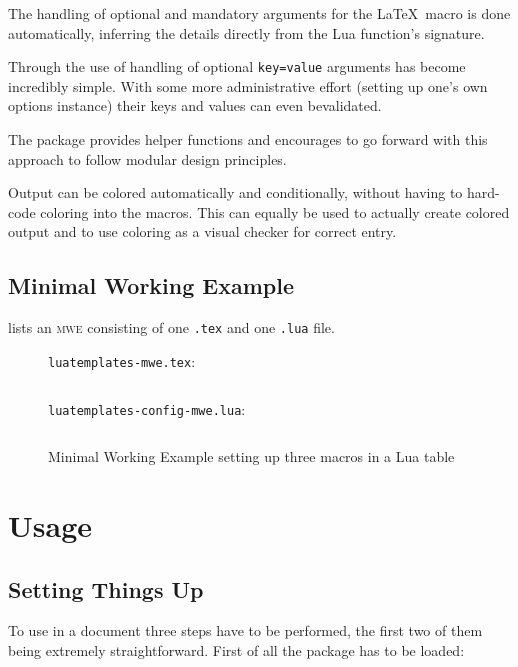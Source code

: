 \documentclass{scrartcl}
\begin{document}
\begin{itemize*}
\item The handling of optional and mandatory arguments for the \LaTeX\ macro is
done automatically, inferring the details directly from the Lua function's signature.
\item Through the use of  handling of optional
\texttt{key=value} arguments has become incredibly simple.  With some more
administrative effort (setting up one's own options instance) their keys and
values can even bevalidated.
\item The package provides helper functions and encourages to go forward with
this approach to follow modular design principles.
\item Output can be colored automatically and conditionally, without having to
hard-code coloring into the macros. This can equally be used to actually create
colored output and to use coloring as a visual checker for correct entry.
\end{itemize*}


\subsection{Minimal Working Example}
\label{sec:mwe}

 lists an \textsc{mwe} consisting of one \texttt{.tex} and one
\texttt{.lua} file.

\begin{figure}
\texttt{luatemplates-mwe.tex}:

\inputminted[frame=lines]{tex}{luatemplates-mwe.tex}

\noindent
\texttt{luatemplates-config-mwe.lua}:

\inputminted[frame=lines]{lua}{luatemplates-config-mwe.lua}

\caption{Minimal Working Example setting up three macros in a Lua table}
\label{fig:mwe}
\end{figure}


\section{Usage}
\label{sec:usage}

\subsection{Setting Things Up}
\label{sec:setup}

To use  in a document three steps have to be performed,
the first two of them being extremely straightforward. First of all the package
has to be loaded:
\end{document}

